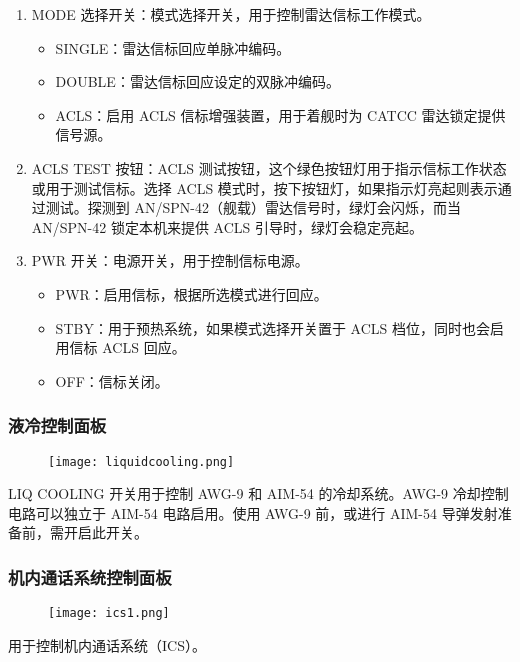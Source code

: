 \begin{enumerate}
	\item MODE 选择开关：模式选择开关，用于控制雷达信标工作模式。
	      \begin{itemize}
		      \item SINGLE：雷达信标回应单脉冲编码。
		      \item DOUBLE：雷达信标回应设定的双脉冲编码。
		      \item ACLS：启用 ACLS 信标增强装置，用于着舰时为 CATCC 雷达锁定提供信号源。
	      \end{itemize}
	\item ACLS TEST 按钮：ACLS 测试按钮，这个绿色按钮灯用于指示信标工作状态或用于测试信标。选择 ACLS 模式时，按下按钮灯，如果指示灯亮起则表示通过测试。探测到 AN/SPN-42（舰载）雷达信号时，绿灯会闪烁，而当 AN/SPN-42 锁定本机来提供 ACLS 引导时，绿灯会稳定亮起。
	\item PWR 开关：电源开关，用于控制信标电源。
	      \begin{itemize}
		      \item PWR：启用信标，根据所选模式进行回应。
		      \item STBY：用于预热系统，如果模式选择开关置于 ACLS 档位，同时也会启用信标 ACLS 回应。
		      \item OFF：信标关闭。
	      \end{itemize}
\end{enumerate}

\subsubsection{液冷控制面板}
\begin{figure}[htb]
	\centering
	\texttt{[image: liquidcooling.png]}
\end{figure}
LIQ COOLING 开关用于控制 AWG-9 和 AIM-54 的冷却系统。AWG-9 冷却控制电路可以独立于 AIM-54 电路启用。使用 AWG-9 前，或进行 AIM-54 导弹发射准备前，需开启此开关。

\subsubsection{机内通话系统控制面板}
\begin{figure}[htb]
	\centering
	\texttt{[image: ics1.png]}
\end{figure}
用于控制机内通话系统（ICS）。

